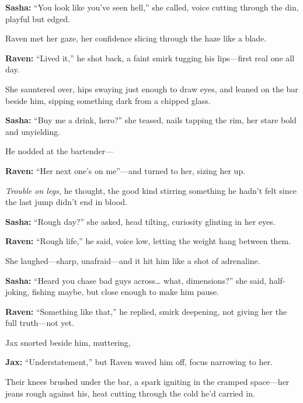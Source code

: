 \documentclass[12pt]{book}
\begin{document}
\vspace{0.5em}
\textbf{Sasha:} “You look like you’ve seen hell,” she called, voice cutting through the din, playful but edged.

Raven met her gaze, her confidence slicing through the haze like a blade.

\vspace{0.5em}
\textbf{Raven:} “Lived it,” he shot back, a faint smirk tugging his lips—first real one all day.

She sauntered over, hips swaying just enough to draw eyes, and leaned on the bar beside him, sipping something dark from a chipped glass.

\vspace{0.5em}
\textbf{Sasha:} “Buy me a drink, hero?” she teased, nails tapping the rim, her stare bold and unyielding.

He nodded at the bartender—

\vspace{0.5em}
\textbf{Raven:} “Her next one’s on me”—and turned to her, sizing her up.

\textit{Trouble on legs,} he thought, the good kind stirring something he hadn’t felt since the last jump didn’t end in blood.

\vspace{0.5em}
\textbf{Sasha:} “Rough day?” she asked, head tilting, curiosity glinting in her eyes.

\vspace{0.5em}
\textbf{Raven:} “Rough life,” he said, voice low, letting the weight hang between them.

She laughed—sharp, unafraid—and it hit him like a shot of adrenaline.

\vspace{0.5em}
\textbf{Sasha:} “Heard you chase bad guys across… what, dimensions?” she said, half-joking, fishing maybe, but close enough to make him pause.

\vspace{0.5em}
\textbf{Raven:} “Something like that,” he replied, smirk deepening, not giving her the full truth—not yet.

Jax snorted beside him, muttering,

\vspace{0.5em}
\textbf{Jax:} “Understatement,” but Raven waved him off, focus narrowing to her.

Their knees brushed under the bar, a spark igniting in the cramped space—her jeans rough against his, heat cutting through the cold he’d carried in.
\end{document}
